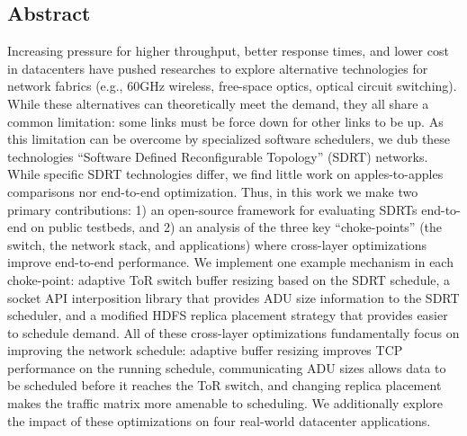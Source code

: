 \subsection*{Abstract}
Increasing pressure for higher throughput, better response times, and lower cost
in datacenters have pushed researches to explore alternative technologies for
network fabrics (e.g., 60GHz wireless, free-space optics, optical circuit
switching). While these alternatives can theoretically meet the demand, they all
share a common limitation: some links must be force down for other links to be
up. As this limitation can be overcome by specialized software schedulers, we
dub these technologies ``Software Defined Reconfigurable Topology'' (SDRT)
networks. While specific SDRT technologies differ, we find little work on
apples-to-apples comparisons nor end-to-end optimization. Thus, in this work we
make two primary contributions: 1) an open-source framework for evaluating SDRTs
end-to-end on public testbeds, and 2) an analysis of the three key
``choke-points'' (the switch, the network stack, and applications) where
cross-layer optimizations improve end-to-end performance. We implement one
example mechanism in each choke-point: adaptive ToR switch buffer resizing based
on the SDRT schedule, a socket API interposition library that provides ADU size
information to the SDRT scheduler, and a modified HDFS replica placement
strategy that provides easier to schedule demand. All of these cross-layer
optimizations fundamentally focus on improving the network schedule: adaptive
buffer resizing improves TCP performance on the running schedule, communicating
ADU sizes allows data to be scheduled before it reaches the ToR switch, and
changing replica placement makes the traffic matrix more amenable to scheduling.
We additionally explore the impact of these optimizations on four real-world
datacenter applications.




